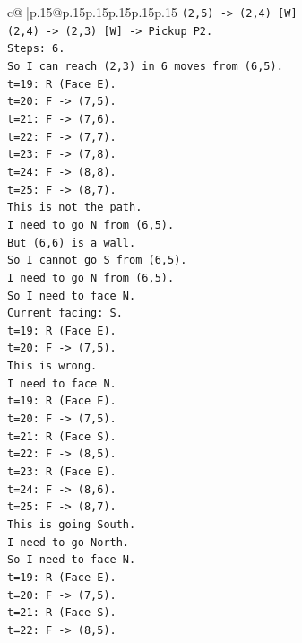 \documentclass{article}
\begin{document}
{\begin{supertabular}{c@{$\;$}|p{.15\linewidth}@{}p{.15\linewidth}p{.15\linewidth}p{.15\linewidth}p{.15\linewidth}p{.15\linewidth}}
{{{\texttt{(2,5) {-}> (2,4) {[}W{]}} \\
\texttt{(2,4) {-}> (2,3) {[}W{]} {-}> Pickup P2.} \\
\texttt{Steps: 6.} \\
\texttt{So I can reach (2,3) in 6 moves from (6,5).} \\
\texttt{t=19: R (Face E).} \\
\texttt{t=20: F {-}> (7,5).} \\
\texttt{t=21: F {-}> (7,6).} \\
\texttt{t=22: F {-}> (7,7).} \\
\texttt{t=23: F {-}> (7,8).} \\
\texttt{t=24: F {-}> (8,8).} \\
\texttt{t=25: F {-}> (8,7).} \\
\texttt{This is not the path.} \\
\texttt{I need to go N from (6,5).} \\
\texttt{But (6,6) is a wall.} \\
\texttt{So I cannot go S from (6,5).} \\
\texttt{I need to go N from (6,5).} \\
\texttt{So I need to face N.} \\
\texttt{Current facing: S.} \\
\texttt{t=19: R (Face E).} \\
\texttt{t=20: F {-}> (7,5).} \\
\texttt{This is wrong.} \\
\texttt{I need to face N.} \\
\texttt{t=19: R (Face E).} \\
\texttt{t=20: F {-}> (7,5).} \\
\texttt{t=21: R (Face S).} \\
\texttt{t=22: F {-}> (8,5).} \\
\texttt{t=23: R (Face E).} \\
\texttt{t=24: F {-}> (8,6).} \\
\texttt{t=25: F {-}> (8,7).} \\
\texttt{This is going South.} \\
\texttt{I need to go North.} \\
\texttt{So I need to face N.} \\
\texttt{t=19: R (Face E).} \\
\texttt{t=20: F {-}> (7,5).} \\
\texttt{t=21: R (Face S).} \\
\texttt{t=22: F {-}> (8,5).} \\
}}}
\end{supertabular}}
\end{document}
